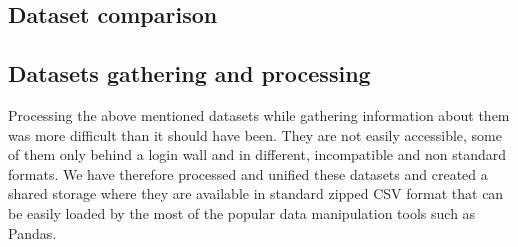 \subsection{Dataset comparison}

\subsection{Datasets gathering and processing} \label{subsec:04_single_user_datasets.gathering_processing}

Processing the above mentioned datasets while gathering information about them was more difficult than it should have been. They are not easily accessible, some of them only behind a login wall and in different, incompatible and non standard formats. We have therefore processed and unified these datasets and created a shared storage where they are available in standard zipped CSV format that can be easily loaded by the most of the popular data manipulation tools such as Pandas.

